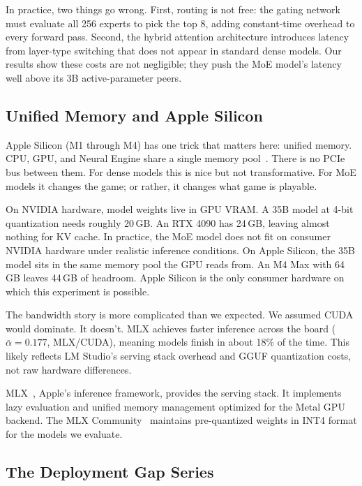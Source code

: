\documentclass[11pt]{article}
\begin{document}
In practice, two things go wrong.  First, routing is not free: the gating network must evaluate all 256 experts to pick the top 8, adding constant-time overhead to every forward pass.  Second, the hybrid attention architecture introduces latency from layer-type switching that does not appear in standard dense models.  Our results show these costs are not negligible; they push the MoE model's latency well above its 3B active-parameter peers.

\subsection{Unified Memory and Apple Silicon}
\label{sec:unified-memory}

Apple Silicon (M1 through M4) has one trick that matters here: unified memory.  CPU, GPU, and Neural Engine share a single memory pool~\citep{hannun2023mlx}.  There is no PCIe bus between them.  For dense models this is nice but not transformative.  For MoE models it changes the game; or rather, it changes what game is playable.

On NVIDIA hardware, model weights live in GPU VRAM.  A 35B model at 4-bit quantization needs roughly 20\,GB.  An RTX 4090 has 24\,GB, leaving almost nothing for KV cache.  In practice, the MoE model does not fit on consumer NVIDIA hardware under realistic inference conditions.  On Apple Silicon, the 35B model sits in the same memory pool the GPU reads from.  An M4 Max with 64\,GB leaves 44\,GB of headroom.  Apple Silicon is the only consumer hardware on which this experiment is possible.

The bandwidth story is more complicated than we expected.  We assumed CUDA would dominate.  It doesn't.  MLX achieves faster inference across the board ($\bar{\alpha} = 0.177$, MLX/CUDA), meaning models finish in about 18\% of the time.  This likely reflects LM Studio's serving stack overhead and GGUF quantization costs, not raw hardware differences.

MLX~\citep{hannun2023mlx}, Apple's inference framework, provides the serving stack.  It implements lazy evaluation and unified memory management optimized for the Metal GPU backend.  The MLX Community~\citep{mlxcommunity2024} maintains pre-quantized weights in INT4 format for the models we evaluate.

\subsection{The Deployment Gap Series}
\label{sec:series-recap}
\end{document}
